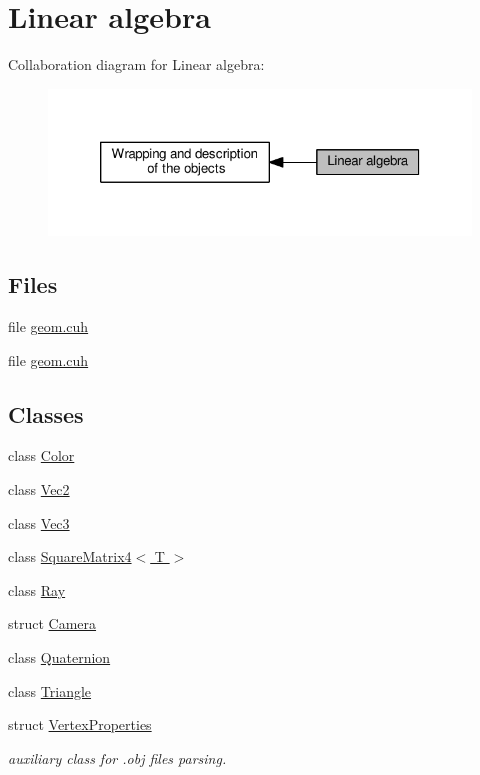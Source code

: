 \hypertarget{group__linear__algebra}{}\section{Linear algebra}
\label{group__linear__algebra}
Collaboration diagram for Linear algebra\+:
\nopagebreak
\begin{figure}[H]
\begin{center}
\leavevmode
\includegraphics[width=320pt]{group__linear__algebra}
\end{center}
\end{figure}
\subsection*{Files}
\begin{DoxyCompactItemize}
\item 
file \hyperlink{r_t_tracer_2include_2geom_8cuh}{geom.\+cuh}
\item 
file \hyperlink{cuda_tracer__0__1_2include_2geom_8cuh}{geom.\+cuh}
\end{DoxyCompactItemize}
\subsection*{Classes}
\begin{DoxyCompactItemize}
\item 
class \hyperlink{class_color}{Color}
\item 
class \hyperlink{class_vec2}{Vec2}
\item 
class \hyperlink{class_vec3}{Vec3}
\item 
class \hyperlink{class_square_matrix4}{Square\+Matrix4$<$ T $>$}
\item 
class \hyperlink{class_ray}{Ray}
\item 
struct \hyperlink{struct_camera}{Camera}
\item 
class \hyperlink{class_quaternion}{Quaternion}
\item 
class \hyperlink{class_triangle}{Triangle}
\item 
struct \hyperlink{struct_vertex_properties}{Vertex\+Properties}
\begin{DoxyCompactList}\small\item\em auxiliary class for .obj files parsing. \end{DoxyCompactList}\end{DoxyCompactItemize}
